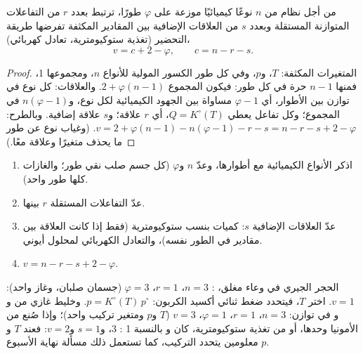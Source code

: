 \begin{theorem}\label{thm:b2:equilibrium-shifts:phase-rule}
من أجل نظام من $n$ نوعًا كيميائيًا موزعة على $\varphi$ طورًا، ترتبط بعدد $r$
من التفاعلات المتوازنة المستقلة وبعدد $s$ من العلاقات الإضافية بين المقادير
المكثفة تفرضها طريقة التحضير (تغذية ستوكيومترية،
تعادل كهربائي)،
\[
  v = c + 2 - \varphi, \qquad c = n - r - s .
\]
\end{theorem}

\begin{proof}
المتغيرات المكثفة: $T$، و$p$، وفي كل طور الكسور المولية
للأنواع $n$، ومجموعها 1، فمنها $n - 1$ حرة في كل طور: فيكون المجموع $2 +
\varphi(n - 1)$. والعلاقات: كل نوع في توازن بين
الأطوار، أي $\varphi - 1$ مساواة بين الجهود الكيميائية لكل نوع، و$n(\varphi -
1)$ في المجموع؛ وكل تفاعل يعطي $Q = K^\circ(T)$، أي $r$ علاقة؛ و$s$
علاقة إضافية. وبالطرح: $v = 2 + \varphi(n - 1) - n(\varphi - 1) - r -
s = n - r - s + 2 - \varphi$. (وغياب نوع عن طور ما يحذف متغيرًا
وعلاقة معًا.)
\end{proof}

\begin{method}\label{met:b2:equilibrium-shifts:variance}
\begin{enumerate}
  \item اذكر الأنواع الكيميائية مع أطوارها، وعدّ $n$ و$\varphi$
        (كل جسم صلب نقي طور؛ والغازات كلها طور واحد).
  \item عدّ التفاعلات المستقلة $r$ بينها.
  \item عدّ العلاقات الإضافية $s$: كميات بنسب ستوكيومترية
        (فقط إذا كانت العلاقة بين مقادير في الطور نفسه)،
        والتعادل الكهربائي لمحلول أيوني.
  \item $v = n - r - s + 2 - \varphi$.
\end{enumerate}
\end{method}

\begin{example}\label{ex:b2:equilibrium-shifts:variances}
الحجر الجيري في وعاء مغلق، : $n = 3$، $r =
1$، $\varphi = 3$ (جسمان صلبان، وغاز واحد): $v = 1$. اختر $T$، فيتحدد ضغط
ثنائي أكسيد الكربون: $p = K^\circ(T)\,p^\circ$. وخليط غازي من
 و و في توازن: $n = 3$، $r = 1$، $\varphi = 1$، $v
= 3$ ($T$ و$p$ ومتغير تركيب واحد)؛ وإذا صُنع من الأمونيا وحدها، أو من
تغذية ستوكيومترية، كان  و بالنسبة 1 : 3، و$s = 1$
و$v = 2$: فعند $T$ و$p$ معلومين يتحدد التركيب، كما تستعمل ذلك مسألة
نهاية الأسبوع.
\end{example}

